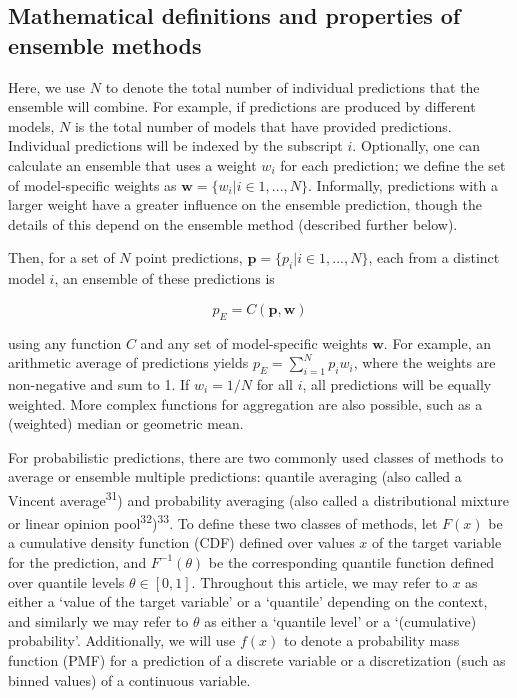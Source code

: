 \documentclass[
  letterpaper,
  DIV=11,
  numbers=noendperiod]{scrartcl}
\begin{document}
\subsection{Mathematical definitions and properties of ensemble
methods}\label{mathematical-definitions-and-properties-of-ensemble-methods}

Here, we use \(N\) to denote the total number of individual predictions
that the ensemble will combine. For example, if predictions are produced
by different models, \(N\) is the total number of models that have
provided predictions. Individual predictions will be indexed by the
subscript \(i\). Optionally, one can calculate an ensemble that uses a
weight \(w_i\) for each prediction; we define the set of model-specific
weights as \(\pmb{w} = \{w_i | i \in 1, ..., N\}\). Informally,
predictions with a larger weight have a greater influence on the
ensemble prediction, though the details of this depend on the ensemble
method (described further below).

Then, for a set of \(N\) point predictions,
\(\pmb{p} = \{p_i|i \in 1, ..., N\}\), each from a distinct model \(i\),
an ensemble of these predictions is

\[
p_E = C(\pmb{p}, \pmb{w}) 
\]

using any function \(C\) and any set of model-specific weights
\(\pmb{w}\). For example, an arithmetic average of predictions yields
\(p_E = \sum_{i=1}^Np_iw_i\), where the weights are non-negative and sum
to 1. If \(w_i = 1/N\) for all \(i\), all predictions will be equally
weighted. More complex functions for aggregation are also possible, such
as a (weighted) median or geometric mean.

For probabilistic predictions, there are two commonly used classes of
methods to average or ensemble multiple predictions: quantile averaging
(also called a Vincent average\textsuperscript{31}) and probability
averaging (also called a distributional mixture or linear opinion
pool\textsuperscript{32})\textsuperscript{33}. To define these two
classes of methods, let \(F(x)\) be a cumulative density function (CDF)
defined over values \(x\) of the target variable for the prediction, and
\(F^{-1}(\theta)\) be the corresponding quantile function defined over
quantile levels \(\theta \in [0, 1]\). Throughout this article, we may
refer to \(x\) as either a `value of the target variable' or a
`quantile' depending on the context, and similarly we may refer to
\(\theta\) as either a `quantile level' or a `(cumulative) probability'.
Additionally, we will use \(f(x)\) to denote a probability mass function
(PMF) for a prediction of a discrete variable or a discretization (such
as binned values) of a continuous variable.
\end{document}
